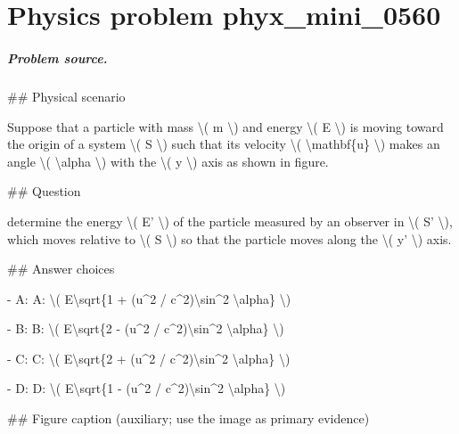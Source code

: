 
\chapter{Physics problem phyx\_mini\_0560}
\label{ch:PhyXMiniProblems_problem_phyx_mini_0560}

\paragraph{Problem source.}
\#\# Physical scenario

Suppose that a particle with mass \textbackslash{}( m \textbackslash{}) and energy \textbackslash{}( E \textbackslash{}) is moving toward the origin of a system \textbackslash{}( S \textbackslash{}) such that its velocity \textbackslash{}( \textbackslash{}mathbf\{u\} \textbackslash{}) makes an angle \textbackslash{}( \textbackslash{}alpha \textbackslash{}) with the \textbackslash{}( y \textbackslash{}) axis as shown in figure.

\#\# Question

determine the energy \textbackslash{}( E' \textbackslash{}) of the particle measured by an observer in \textbackslash{}( S' \textbackslash{}), which moves relative to \textbackslash{}( S \textbackslash{}) so that the particle moves along the \textbackslash{}( y' \textbackslash{}) axis.

\#\# Answer choices

- A: A: \textbackslash{}( E\textbackslash{}sqrt\{1 + (u\textasciicircum{}2 / c\textasciicircum{}2)\textbackslash{}sin\textasciicircum{}2 \textbackslash{}alpha\} \textbackslash{})

- B: B: \textbackslash{}( E\textbackslash{}sqrt\{2 - (u\textasciicircum{}2 / c\textasciicircum{}2)\textbackslash{}sin\textasciicircum{}2 \textbackslash{}alpha\} \textbackslash{})

- C: C: \textbackslash{}( E\textbackslash{}sqrt\{2 + (u\textasciicircum{}2 / c\textasciicircum{}2)\textbackslash{}sin\textasciicircum{}2 \textbackslash{}alpha\} \textbackslash{})

- D: D: \textbackslash{}( E\textbackslash{}sqrt\{1 - (u\textasciicircum{}2 / c\textasciicircum{}2)\textbackslash{}sin\textasciicircum{}2 \textbackslash{}alpha\} \textbackslash{})

\#\# Figure caption (auxiliary; use the image as primary evidence)

